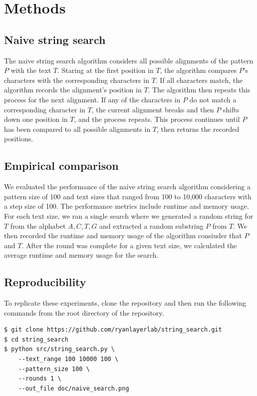 \documentclass[11pt, letterpaper]{article}
\begin{document}

\section{Methods}

\subsection{Naive string search}
The naive string search algorithm considers all possible alignments of the
pattern $P$ with the text $T$. Staring at the first position in $T$, the
algorithm compares $P$'s characters with the corresponding characters in $T$.
If all characters match, the algorithm records the alignment's position in $T$.
The algorithm then repeats this process for the next alignment. If any of the 
characters in $P$ do not match a corresponding character in $T$, the current
alignment breaks and then $P$ shifts down one position in $T$, and the process
repeats. This process continues until $P$ has been compared to all possible
alignments in $T$, then returns the recorded positions.

\subsection{Empirical comparison}

We evaluated the performance of the naive string search algorithm considering a
pattern size of 100 and text sizes that ranged from 100 to 10,000 characters
with a step size of 100.  The performance metrics include runtime and memory
usage. For each text size, we ran a single search where we generated a random
string for $T$ from the alphabet ${A, C, T, G}$ and extracted a random
substring $P$ from $T$. We then recorded the runtime and memory usage of the
algorithm consiuder that $P$ and $T$. After the round was complete for a given
text size, we calculated the average runtime and memory usage for the search.

\subsection{Reproducibility}
To replicate these experiments, clone the repository and then run the
following commands from the root directory of the repository.
\begin{verbatim}
$ git clone https://github.com/ryanlayerlab/string_search.git
$ cd string_search
$ python src/string_search.py \
    --text_range 100 10000 100 \
    --pattern_size 100 \
    --rounds 1 \
    --out_file doc/naive_search.png
\end{verbatim}
\end{document}
